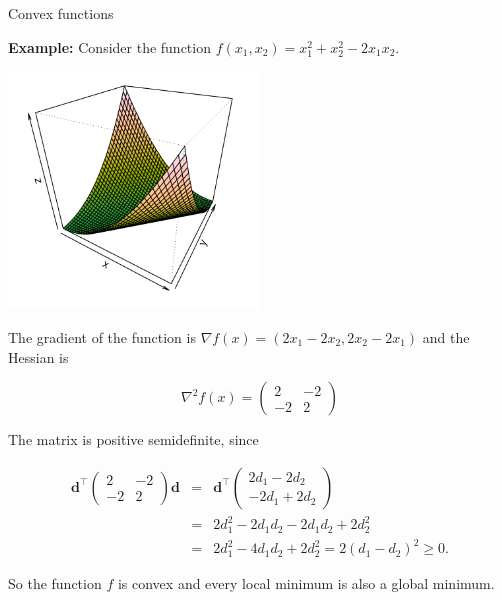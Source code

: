 \begin{vbframe}{Convex functions}
\framebreak



\textbf{Example:} Consider the function $f(x_1, x_2) = x_1^2 + x_2^2 - 2x_1x_2$.

\begin{center}
	\includegraphics[width = 0.5\textwidth]{figure_man/convex-example.png}
\end{center}



The gradient of the function is $\nabla f(x) = (2x_1 - 2x_2, 2x_2 - 2x_1)$ and the Hessian is

$$
\nabla^2 f(x) = \begin{pmatrix} 2 & -2 \\ -2 & 2 \end{pmatrix}
$$

\lz

The matrix is positive semidefinite, since

\begin{eqnarray*}
\mathbf{d}^{\top}\begin{pmatrix} 2 & -2 \\ -2 & 2 \end{pmatrix}\mathbf{d} &=& \mathbf{d}^{\top} \begin{pmatrix} 2d_1 - 2d_2 \\ -2d_1 + 2d_2\end{pmatrix} \\ &=& 2d_1^2 - 2d_1d_2 -2d_1d_2 + 2d_2^2 \\ &=& 2d_1^2 - 4d_1d_2 + 2d_2^2 = 2 (d_1 - d_2)^2 \ge 0.
\end{eqnarray*}

So the function $f$ is convex and every local minimum is also a global minimum.

\end{vbframe}

\endlecture
